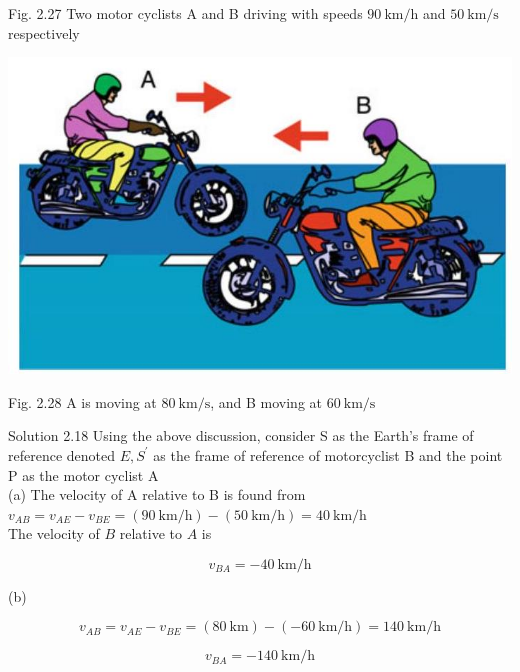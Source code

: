 \documentclass[10pt]{article}
\begin{document}
Fig. 2.27 Two motor cyclists A and B driving with speeds $90 \mathrm{~km} / \mathrm{h}$ and $50 \mathrm{~km} / \mathrm{s}$ respectively

\begin{center}
\includegraphics[max width=\textwidth]{2024_09_13_db1f357d2aad0a03eb2eg-042(1)}
\end{center}

Fig. 2.28 A is moving at $80 \mathrm{~km} / \mathrm{s}$, and B moving at $60 \mathrm{~km} / \mathrm{s}$

Solution 2.18 Using the above discussion, consider S as the Earth's frame of reference denoted $E, S^{\prime}$ as the frame of reference of motorcyclist B and the point P as the motor cyclist A\\
(a) The velocity of A relative to B is found from\\
$v_{A B}=v_{A E}-v_{B E}=(90 \mathrm{~km} / \mathrm{h})-(50 \mathrm{~km} / \mathrm{h})=40 \mathrm{~km} / \mathrm{h}$\\
The velocity of $B$ relative to $A$ is

$$
v_{B A}=-40 \mathrm{~km} / \mathrm{h}
$$

(b)

$$
v_{A B}=v_{A E}-v_{B E}=(80 \mathrm{~km})-(-60 \mathrm{~km} / \mathrm{h})=140 \mathrm{~km} / \mathrm{h}
$$

$$
v_{B A}=-140 \mathrm{~km} / \mathrm{h}
$$
\end{document}
